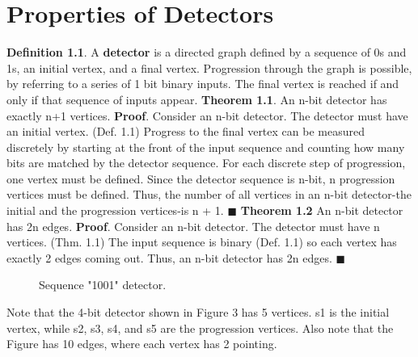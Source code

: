 \documentclass[12pt]{article}
\begin{document}
\section[20pt]{Properties of Detectors}
\textbf{Definition 1.1}. A \textbf{detector} is a directed graph defined by a sequence of 0s and 1s, an initial vertex, and a final vertex. Progression through the graph is possible, by referring to a series of 1 bit binary inputs. The final vertex is reached if and only if that sequence of inputs appear.
\newline
\newline
\textbf{Theorem 1.1}. An n-bit detector has exactly n+1 vertices.
\newline
\textbf{Proof}. Consider an n-bit detector. \newline
The detector must have an initial vertex. (Def. 1.1) \newline
Progress to the final vertex can be measured discretely by starting at the front of the input sequence and counting how many bits are matched by the detector sequence. For each discrete step of progression, one vertex must be defined. Since the detector sequence is n-bit, n progression vertices must be defined. \newline
Thus, the number of all vertices in an n-bit detector-the initial and the progression vertices-is n + 1. \newline
\(\blacksquare\) \newline
\newline
\textbf{Theorem 1.2} An n-bit detector has 2n edges. \newline
\textbf{Proof}. Consider an n-bit detector. \newline
The detector must have n vertices. (Thm. 1.1) \newline
The input sequence is binary (Def. 1.1) so each vertex has exactly 2 edges coming out. Thus, an n-bit detector has 2n edges. \newline
\(\blacksquare\) \newline
\newline
\begin{figure}[ht]
	\centering
	\caption{Sequence "1001" detector.}
\end{figure}
\newline
Note that the 4-bit detector shown in Figure 3 has 5 vertices. s1 is the initial vertex, while s2, s3, s4, and s5 are the progression vertices. Also note that the Figure has 10 edges, where each vertex has 2 pointing.
\newpage
\end{document}
